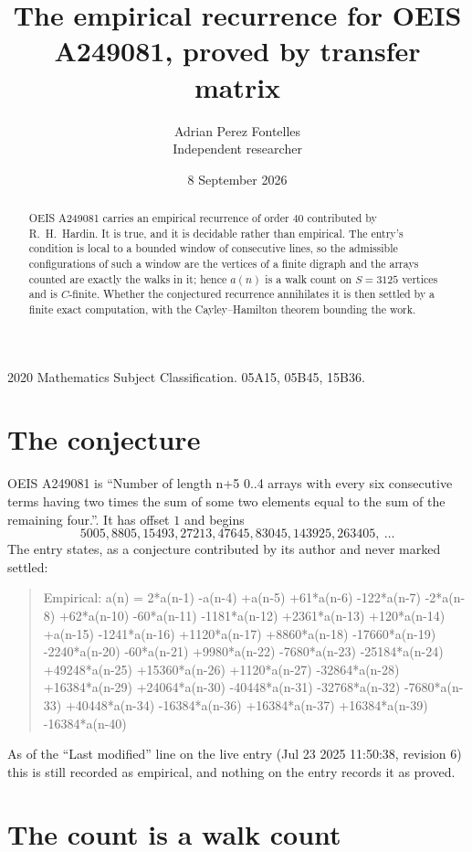 \documentclass[11pt,a4paper]{article}
\title{The empirical recurrence for OEIS A249081, proved by transfer matrix}
\author{Adrian Perez Fontelles\\ \small Independent researcher}
\date{8 September 2026}
\theoremstyle{plain}
\theoremstyle{definition}
\begin{document}
\maketitle

\begin{abstract}
OEIS A249081 carries an empirical recurrence of order $40$ contributed by R.~H.~Hardin. It is
true, and it is decidable rather than empirical. The entry's condition is local to a bounded window of consecutive lines, so
the admissible configurations of such a window are the vertices of a finite digraph and the
arrays counted are exactly the walks in it; hence $a(n)$ is a walk count on $S=3125$ vertices
and is $C$-finite. Whether the conjectured recurrence annihilates it is then settled by a
finite exact computation, with the Cayley--Hamilton theorem bounding the work.
\end{abstract}

\noindent\small 2020 Mathematics Subject Classification. 05A15, 05B45, 15B36.\normalsize

\section{The conjecture}

OEIS A249081 is ``Number of length n+5 0..4 arrays with every six consecutive terms having two times the sum of some two elements equal to the sum of the remaining four.''. It has offset $1$ and begins
\[
5005, 8805, 15493, 27213, 47645, 83045, 143925, 263405,\ \dots
\]
The entry states, as a conjecture contributed by its author and never marked settled:
\begin{quote}
Empirical: a(n) = 2*a(n-1) -a(n-4) +a(n-5) +61*a(n-6) -122*a(n-7) -2*a(n-8) +62*a(n-10) -60*a(n-11) -1181*a(n-12) +2361*a(n-13) +120*a(n-14) +a(n-15) -1241*a(n-16) +1120*a(n-17) +8860*a(n-18) -17660*a(n-19) -2240*a(n-20) -60*a(n-21) +9980*a(n-22) -7680*a(n-23) -25184*a(n-24) +49248*a(n-25) +15360*a(n-26) +1120*a(n-27) -32864*a(n-28) +16384*a(n-29) +24064*a(n-30) -40448*a(n-31) -32768*a(n-32) -7680*a(n-33) +40448*a(n-34) -16384*a(n-36) +16384*a(n-37) +16384*a(n-39) -16384*a(n-40)
\end{quote}
As of the ``Last modified'' line on the live entry (Jul 23 2025 11:50:38, revision 6) this is still
recorded as empirical, and nothing on the entry records it as proved.

\section{The count is a walk count}
\end{document}
